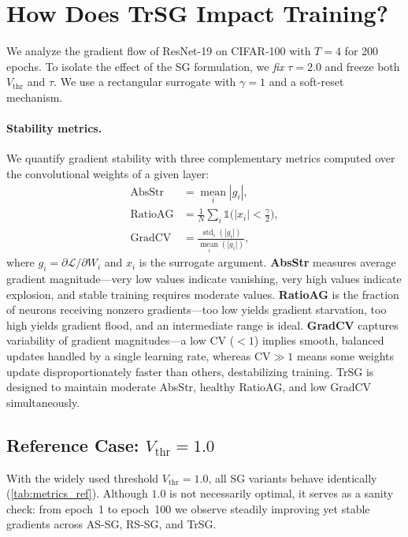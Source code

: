 \section{How Does TrSG Impact Training?}
\label{sec:exp_trsg_impact}

We analyze the gradient flow of ResNet-19 on CIFAR-100 with $T=4$ for 200 epochs. To isolate the effect of the SG formulation, we \emph{fix} $\tau=2.0$ and freeze both $V_{\text{thr}}$ and $\tau$. We use a rectangular surrogate with $\gamma=1$ and a soft-reset mechanism.

\paragraph{Stability metrics.}
We quantify gradient stability with three complementary metrics computed over the convolutional weights of a given layer:
\begin{align}
\text{AbsStr} &= \operatorname*{mean}_{i} |g_{i}|, \\
\text{RatioAG} &= \frac{1}{N}\sum_{i} \mathds{1}\!\bigl(|x_{i}|<\tfrac{\gamma}{2}\bigr), \\
\text{GradCV} &= \frac{\operatorname{std}_{i}(|g_{i}|)}{\operatorname*{mean}_{i}(|g_{i}|)},
\end{align}
where $g_{i}=\partial \mathcal{L}/\partial W_{i}$ and $x_{i}$ is the surrogate argument. \textbf{AbsStr} measures average gradient magnitude—very low values indicate vanishing, very high values indicate explosion, and stable training requires moderate values. \textbf{RatioAG} is the fraction of neurons receiving nonzero gradients—too low yields gradient starvation, too high yields gradient flood, and an intermediate range is ideal. \textbf{GradCV} captures variability of gradient magnitudes—a low CV ($<1$) implies smooth, balanced updates handled by a single learning rate, whereas $\mathrm{CV}\gg1$ means some weights update disproportionately faster than others, destabilizing training. TrSG is designed to maintain moderate AbsStr, healthy RatioAG, and low GradCV simultaneously.

\subsection{Reference Case: $V_{\text{thr}}=1.0$}
\label{subsec:exp_trsg_metric_ref}

With the widely used threshold $V_{\text{thr}}=1.0$, all SG variants behave identically (\cref{tab:metrics_ref}). Although $1.0$ is not necessarily optimal, it serves as a sanity check: from epoch~1 to epoch~100 we observe steadily improving yet stable gradients across AS-SG, RS-SG, and TrSG.

